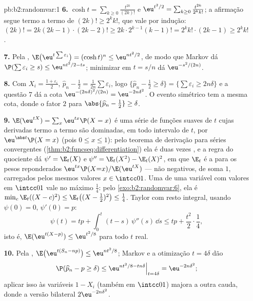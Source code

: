 \begin{solution}{pb:b2:randomvar:1}
\textbf{6.} $\cosh t = \sum_{k\geq0}\frac{t^{2k}}{(2k)!}$ e
$\eu^{t^2/2} = \sum_{k\geq0}\frac{t^{2k}}{2^kk!}$; a afirmação
segue termo a termo de $(2k)! \geq 2^kk!$, que vale por
indução: $(2k)! = 2k(2k-1)\cdot(2k-2)! \geq 2k\cdot
2^{k-1}(k-1)! = 2^kk!\cdot(2k-1) \geq 2^kk!$.

\textbf{7.} Pela , $\E\bigl(\eu^{t\sum\varepsilon_i}
\bigr) = (\cosh t)^n \leq \eu^{nt^2/2}$, de modo que Markov dá
$\P(\sum\varepsilon_i \geq s) \leq \eu^{nt^2/2 - ts}$;
minimizar em $t = s/n$ dá $\eu^{-s^2/(2n)}$.

\textbf{8.} Com $X_i = \frac{1 + \varepsilon_i}2$, $\widehat
p_n - \frac12 = \frac1{2n}\sum\varepsilon_i$, logo
$\{\widehat p_n - \frac12 \geq \delta\} =
\{\sum\varepsilon_i \geq 2n\delta\}$ e a questão 7 dá a
cota $\eu^{-(2n\delta)^2/(2n)} = \eu^{-2n\delta^2}$. O
evento simétrico tem a mesma cota, donde o fator $2$ para
$\abs{\widehat p_n - \frac12} \geq \delta$.

\textbf{9.} $\E(\eu^{tX}) = \sum_x\eu^{tx}\P(X = x)$ é uma
série de funções suaves de $t$ cujas derivadas termo a
termo são dominadas, em todo intervalo  de $t$, por
$\eu^{\abs t}\P(X = x)$ (pois $0 \leq x \leq 1$): pelo teorema de
derivação para séries  convergentes
(\cref{thm:b2:funcseq:differentiation}) ela é duas vezes
, e a regra do quociente dá $\psi' = \E_t(X)$
e $\psi'' = \E_t(X^2) - \E_t(X)^2$, em que $\E_t$ é a
 para os pesos reponderados
$\eu^{tx}\P(X{=}x)/\E(\eu^{tX})$ --- não negativos, de soma
$1$, carregados pelos mesmos valores $x \in \intcc01$. Uma 
de uma variável com valores em $\intcc01$ vale no máximo $\frac14$: pelo
\cref{exo:b2:randomvar:6}, ela é $\min_c\E_t((X - c)^2) \leq
\E_t\bigl((X - \tfrac12)^2\bigr) \leq \tfrac14$. Taylor com
resto integral, usando $\psi(0) = 0$, $\psi'(0) = p$:
\[
\psi(t) = tp + \int_0^t(t - s)\,\psi''(s)\,\dd s
\leq tp + \frac{t^2}2\cdot\frac14,
\]
isto é, $\E(\eu^{t(X - p)}) \leq \eu^{t^2/8}$ para todo $t$ real.

\textbf{10.} Pela , $\E\bigl(\eu^{t(S_n -
np)}\bigr) \leq \eu^{nt^2/8}$; Markov e a otimização $t
= 4\delta$ dão
\[
\P(\widehat p_n - p \geq \delta)
\leq \eu^{nt^2/8 - tn\delta}\Big|_{t = 4\delta}
= \eu^{-2n\delta^2};
\]
aplicar isso às variáveis $1 - X_i$ (também em
$\intcc01$) majora a outra cauda, donde a versão bilateral
$2\eu^{-2n\delta^2}$.


\end{solution}

